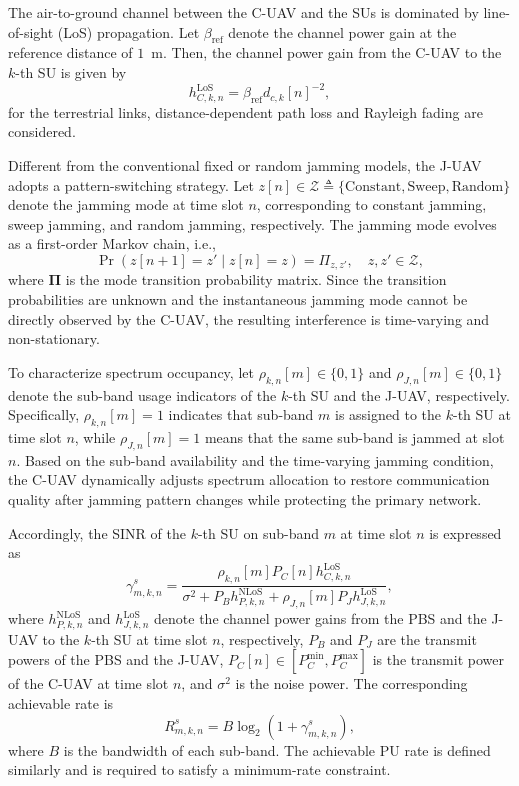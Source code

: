 \documentclass[conference]{IEEEtran}
\begin{document}
The air-to-ground channel between the C-UAV and the SUs is dominated by line-of-sight (LoS) propagation. 
Let $\beta_{\mathrm{ref}}$ denote the channel power gain at the reference distance of $1$~m. 
Then, the channel power gain from the C-UAV to the $k$-th SU is given by
\begin{equation}
h_{C,k,n}^{\mathrm{LoS}}=\beta_{\mathrm{ref}} d_{c,k}[n]^{-2},
\label{eq:los_channel}
\end{equation}
for the terrestrial links, distance-dependent path loss and Rayleigh fading are considered.

Different from the conventional fixed or random jamming models, the J-UAV adopts a pattern-switching strategy. 
Let $z[n]\in\mathcal{Z}\triangleq\{\text{Constant},\text{Sweep},\text{Random}\}$ denote the jamming mode at time slot $n$, corresponding to constant jamming, sweep jamming, and random jamming, respectively. 
The jamming mode evolves as a first-order Markov chain, i.e.,
\begin{equation}
\Pr\!\left(z[n+1]=z' \mid z[n]=z\right)=\Pi_{z,z'}, \quad z,z'\in\mathcal{Z},
\label{eq:markov_jamming}
\end{equation}
where $\boldsymbol{\Pi}$ is the mode transition probability matrix. 
Since the transition probabilities are unknown and the instantaneous jamming mode cannot be directly observed by the C-UAV, the resulting interference is time-varying and non-stationary.

To characterize spectrum occupancy, let $\rho_{k,n}[m]\in\{0,1\}$ and $\rho_{J,n}[m]\in\{0,1\}$ denote the sub-band usage indicators of the $k$-th SU and the J-UAV, respectively. 
Specifically, $\rho_{k,n}[m]=1$ indicates that sub-band $m$ is assigned to the $k$-th SU at time slot $n$, while $\rho_{J,n}[m]=1$ means that the same sub-band is jammed at slot $n$. 
Based on the sub-band availability and the time-varying jamming condition, the C-UAV dynamically adjusts spectrum allocation to restore communication quality after jamming pattern changes while protecting the primary network.

Accordingly, the SINR of the $k$-th SU on sub-band $m$ at time slot $n$ is expressed as
\begin{equation}
\gamma_{m,k,n}^{s}=
\frac{\rho_{k,n}[m] P_C[n] h_{C,k,n}^{\mathrm{LoS}}}
{\sigma^2 + P_B h_{P,k,n}^{\mathrm{NLoS}} + \rho_{J,n}[m] P_J h_{J,k,n}^{\mathrm{LoS}}},
\label{eq:sinr_su}
\end{equation}
where $h_{P,k,n}^{\mathrm{NLoS}}$ and $h_{J,k,n}^{\mathrm{LoS}}$ denote the channel power gains from the PBS and the J-UAV to the $k$-th SU at time slot $n$, 
respectively, $P_B$ and $P_J$ are the transmit powers of the PBS and the J-UAV, $P_C[n]\in[P_C^{\min},P_C^{\max}]$ is the transmit power of the C-UAV at time slot $n$, 
and $\sigma^2$ is the noise power.
The corresponding achievable rate is
\begin{equation}
R_{m,k,n}^{s}=B\log_2\!\left(1+\gamma_{m,k,n}^{s}\right),
\label{eq:rate_su}
\end{equation}
where $B$ is the bandwidth of each sub-band. 
The achievable PU rate is defined similarly and is required to satisfy a minimum-rate constraint.
\end{document}
